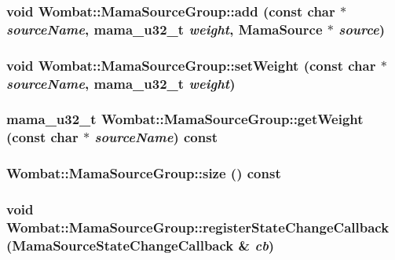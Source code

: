 \hypertarget{classWombat_1_1MamaSourceGroup_a4c92e17561c0984ac40813a6369ba2cc}{
\subsubsection[{add}]{\setlength{\rightskip}{0pt plus 5cm}void Wombat::MamaSourceGroup::add (const char $\ast$ {\em sourceName}, \/  mama\_\-u32\_\-t {\em weight}, \/  {\bf MamaSource} $\ast$ {\em source})}}
\label{classWombat_1_1MamaSourceGroup_a4c92e17561c0984ac40813a6369ba2cc}
\hypertarget{classWombat_1_1MamaSourceGroup_af0433fc93cedaa7ecc8e34a2944b1b17}{
\subsubsection[{setWeight}]{\setlength{\rightskip}{0pt plus 5cm}void Wombat::MamaSourceGroup::setWeight (const char $\ast$ {\em sourceName}, \/  mama\_\-u32\_\-t {\em weight})}}
\label{classWombat_1_1MamaSourceGroup_af0433fc93cedaa7ecc8e34a2944b1b17}
\hypertarget{classWombat_1_1MamaSourceGroup_a32860f8fd7f6030dd6ed3ee698c600a6}{
\subsubsection[{getWeight}]{\setlength{\rightskip}{0pt plus 5cm}mama\_\-u32\_\-t Wombat::MamaSourceGroup::getWeight (const char $\ast$ {\em sourceName}) const}}
\label{classWombat_1_1MamaSourceGroup_a32860f8fd7f6030dd6ed3ee698c600a6}
\hypertarget{classWombat_1_1MamaSourceGroup_a6f661e62632d3ebc68ff768c976dc4e6}{
\subsubsection[{size}]{ Wombat::MamaSourceGroup::size () const}}
\label{classWombat_1_1MamaSourceGroup_a6f661e62632d3ebc68ff768c976dc4e6}
\hypertarget{classWombat_1_1MamaSourceGroup_ac90efed56c8eba034a4d5c034710e637}{
\subsubsection[{registerStateChangeCallback}]{\setlength{\rightskip}{0pt plus 5cm}void Wombat::MamaSourceGroup::registerStateChangeCallback ({\bf MamaSourceStateChangeCallback} \& {\em cb})}}
\label{classWombat_1_1MamaSourceGroup_ac90efed56c8eba034a4d5c034710e637}


